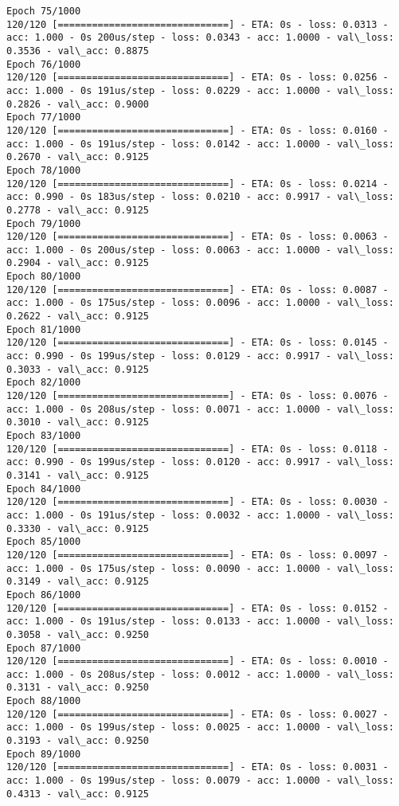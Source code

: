 \documentclass[11pt]{article}
\begin{document}
\begin{Verbatim}[commandchars=\\\{\}]
Epoch 75/1000
120/120 [==============================] - ETA: 0s - loss: 0.0313 - acc: 1.000 - 0s 200us/step - loss: 0.0343 - acc: 1.0000 - val\_loss: 0.3536 - val\_acc: 0.8875
Epoch 76/1000
120/120 [==============================] - ETA: 0s - loss: 0.0256 - acc: 1.000 - 0s 191us/step - loss: 0.0229 - acc: 1.0000 - val\_loss: 0.2826 - val\_acc: 0.9000
Epoch 77/1000
120/120 [==============================] - ETA: 0s - loss: 0.0160 - acc: 1.000 - 0s 191us/step - loss: 0.0142 - acc: 1.0000 - val\_loss: 0.2670 - val\_acc: 0.9125
Epoch 78/1000
120/120 [==============================] - ETA: 0s - loss: 0.0214 - acc: 0.990 - 0s 183us/step - loss: 0.0210 - acc: 0.9917 - val\_loss: 0.2778 - val\_acc: 0.9125
Epoch 79/1000
120/120 [==============================] - ETA: 0s - loss: 0.0063 - acc: 1.000 - 0s 200us/step - loss: 0.0063 - acc: 1.0000 - val\_loss: 0.2904 - val\_acc: 0.9125
Epoch 80/1000
120/120 [==============================] - ETA: 0s - loss: 0.0087 - acc: 1.000 - 0s 175us/step - loss: 0.0096 - acc: 1.0000 - val\_loss: 0.2622 - val\_acc: 0.9125
Epoch 81/1000
120/120 [==============================] - ETA: 0s - loss: 0.0145 - acc: 0.990 - 0s 199us/step - loss: 0.0129 - acc: 0.9917 - val\_loss: 0.3033 - val\_acc: 0.9125
Epoch 82/1000
120/120 [==============================] - ETA: 0s - loss: 0.0076 - acc: 1.000 - 0s 208us/step - loss: 0.0071 - acc: 1.0000 - val\_loss: 0.3010 - val\_acc: 0.9125
Epoch 83/1000
120/120 [==============================] - ETA: 0s - loss: 0.0118 - acc: 0.990 - 0s 199us/step - loss: 0.0120 - acc: 0.9917 - val\_loss: 0.3141 - val\_acc: 0.9125
Epoch 84/1000
120/120 [==============================] - ETA: 0s - loss: 0.0030 - acc: 1.000 - 0s 191us/step - loss: 0.0032 - acc: 1.0000 - val\_loss: 0.3330 - val\_acc: 0.9125
Epoch 85/1000
120/120 [==============================] - ETA: 0s - loss: 0.0097 - acc: 1.000 - 0s 175us/step - loss: 0.0090 - acc: 1.0000 - val\_loss: 0.3149 - val\_acc: 0.9125
Epoch 86/1000
120/120 [==============================] - ETA: 0s - loss: 0.0152 - acc: 1.000 - 0s 191us/step - loss: 0.0133 - acc: 1.0000 - val\_loss: 0.3058 - val\_acc: 0.9250
Epoch 87/1000
120/120 [==============================] - ETA: 0s - loss: 0.0010 - acc: 1.000 - 0s 208us/step - loss: 0.0012 - acc: 1.0000 - val\_loss: 0.3131 - val\_acc: 0.9250
Epoch 88/1000
120/120 [==============================] - ETA: 0s - loss: 0.0027 - acc: 1.000 - 0s 199us/step - loss: 0.0025 - acc: 1.0000 - val\_loss: 0.3193 - val\_acc: 0.9250
Epoch 89/1000
120/120 [==============================] - ETA: 0s - loss: 0.0031 - acc: 1.000 - 0s 199us/step - loss: 0.0079 - acc: 1.0000 - val\_loss: 0.4313 - val\_acc: 0.9125

\end{Verbatim}
\end{document}
